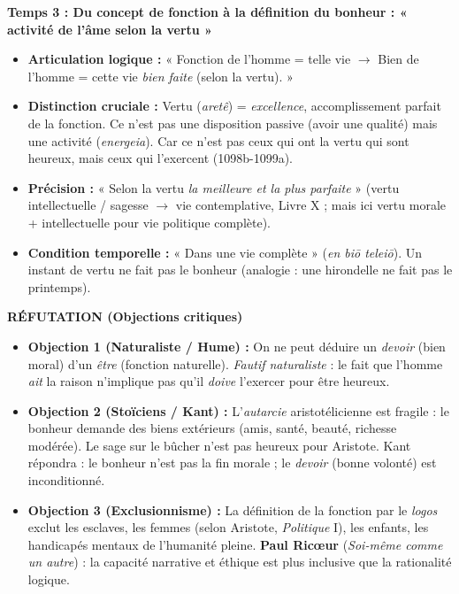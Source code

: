 \documentclass[11pt]{article}
\newcommand{\cle}[1]{{\popxbold\color{popdark}#1}}
\begin{document}
\begin{exoresolu}
\textbf{Temps 3 : Du concept de fonction à la définition du bonheur : « activité de l'âme selon la vertu »}
\begin{itemize}
    \item \textbf{Articulation logique :} « Fonction de l'homme = telle vie $\rightarrow$ Bien de l'homme = cette vie \emph{bien faite} (selon la vertu). »
    \item \textbf{Distinction cruciale :} \cle{Vertu} (\emph{aretê}) = \emph{excellence}, accomplissement parfait de la fonction. Ce n'est pas une disposition passive (avoir une qualité) mais une \cle{activité} (\emph{energeia}). \guillemotleft Car ce n'est pas ceux qui ont la vertu qui sont heureux, mais ceux qui l'exercent \guillemotright (1098b-1099a).
    \item \textbf{Précision :} « Selon la vertu \emph{la meilleure et la plus parfaite} » (vertu intellectuelle / sagesse $\rightarrow$ vie contemplative, Livre X ; mais ici vertu morale + intellectuelle pour vie politique complète).
    \item \textbf{Condition temporelle :} « Dans une vie complète » (\emph{en biō teleiō}). Un instant de vertu ne fait pas le bonheur (analogie : une hirondelle ne fait pas le printemps).
\end{itemize}

\textbf{RÉFUTATION (Objections critiques)}
\begin{itemize}
    \item \textbf{Objection 1 (Naturaliste / Hume) :} \guillemotleft On ne peut déduire un \emph{devoir} (bien moral) d'un \emph{être} (fonction naturelle). \guillemotright \emph{Fautif naturaliste} : le fait que l'homme \emph{ait} la raison n'implique pas qu'il \emph{doive} l'exercer pour être heureux.
    \item \textbf{Objection 2 (Stoïciens / Kant) :} L'\emph{autarcie} aristotélicienne est fragile : le bonheur demande des biens extérieurs (amis, santé, beauté, richesse modérée). Le sage sur le bûcher n'est pas heureux pour Aristote. Kant répondra : le bonheur n'est pas la fin morale ; le \emph{devoir} (bonne volonté) est inconditionné.
    \item \textbf{Objection 3 (Exclusionnisme) :} La définition de la fonction par le \emph{logos} exclut les esclaves, les femmes (selon Aristote, \emph{Politique} I), les enfants, les handicapés mentaux de l'humanité pleine. \textbf{Paul Ricœur} (\emph{Soi-même comme un autre}) : la capacité narrative et éthique est plus inclusive que la rationalité logique.
\end{itemize}


\end{exoresolu}
\end{document}
